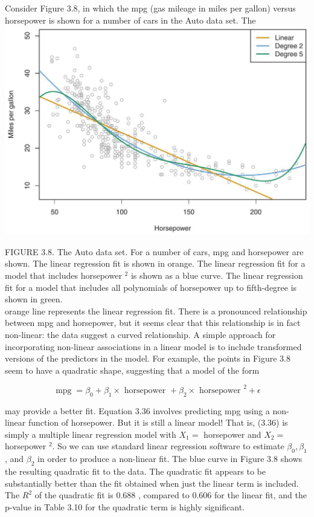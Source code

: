 \documentclass[10pt]{article}
\begin{document}
Consider Figure 3.8, in which the mpg (gas mileage in miles per gallon) versus horsepower is shown for a number of cars in the Auto data set. The\\
\includegraphics[max width=\textwidth, center]{2025_05_05_efe77898333945044de4g-106}

FIGURE 3.8. The Auto data set. For a number of cars, mpg and horsepower are shown. The linear regression fit is shown in orange. The linear regression fit for a model that includes horsepower ${ }^{2}$ is shown as a blue curve. The linear regression fit for a model that includes all polynomials of horsepower up to fifth-degree is shown in green.\\
orange line represents the linear regression fit. There is a pronounced relationship between mpg and horsepower, but it seems clear that this relationship is in fact non-linear: the data suggest a curved relationship. A simple approach for incorporating non-linear associations in a linear model is to include transformed versions of the predictors in the model. For example, the points in Figure 3.8 seem to have a quadratic shape, suggesting that a model of the form


\begin{equation*}
\operatorname{mpg}=\beta_{0}+\beta_{1} \times \text { horsepower }+\beta_{2} \times \text { horsepower }^{2}+\epsilon \tag{3.36}
\end{equation*}


may provide a better fit. Equation 3.36 involves predicting mpg using a non-linear function of horsepower. But it is still a linear model! That is, (3.36) is simply a multiple linear regression model with $X_{1}=$ horsepower and $X_{2}=$ horsepower ${ }^{2}$. So we can use standard linear regression software to estimate $\beta_{0}, \beta_{1}$, and $\beta_{2}$ in order to produce a non-linear fit. The blue curve in Figure 3.8 shows the resulting quadratic fit to the data. The quadratic fit appears to be substantially better than the fit obtained when just the linear term is included. The $R^{2}$ of the quadratic fit is 0.688 , compared to 0.606 for the linear fit, and the p-value in Table 3.10 for the quadratic term is highly significant.
\end{document}
